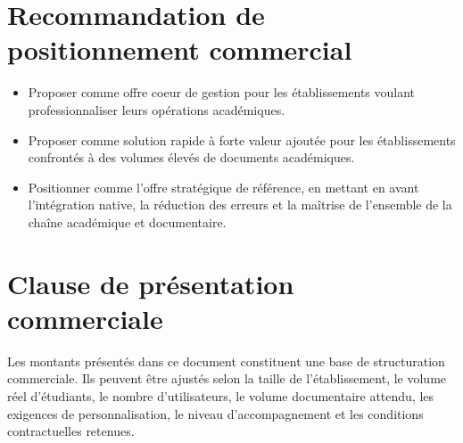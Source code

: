 \documentclass[12pt,a4paper]{article}
\newcommand{\FeatureListStart}{\begin{itemize}[leftmargin=1.2cm,itemsep=0.3em]}
\newcommand{\FeatureListEnd}{\end{itemize}}
\begin{document}
\section{Recommandation de positionnement commercial}

\FeatureListStart
    \item Proposer \AcademicSoftwareName{} comme offre coeur de gestion pour les établissements voulant professionnaliser leurs opérations académiques.
    \item Proposer \DocumentSoftwareName{} comme solution rapide à forte valeur ajoutée pour les établissements confrontés à des volumes élevés de documents académiques.
    \item Positionner \BundleSoftwareName{} comme l'offre stratégique de référence, en mettant en avant l'intégration native, la réduction des erreurs et la maîtrise de l'ensemble de la chaîne académique et documentaire.
\FeatureListEnd

\section{Clause de présentation commerciale}

\begin{tcolorbox}[colback=SoftBlue,colframe=PrimaryBlue]
Les montants présentés dans ce document constituent une base de structuration commerciale. Ils peuvent être ajustés selon la taille de l'établissement, le volume réel d'étudiants, le nombre d'utilisateurs, le volume documentaire attendu, les exigences de personnalisation, le niveau d'accompagnement et les conditions contractuelles retenues.
\end{tcolorbox}
\end{document}
